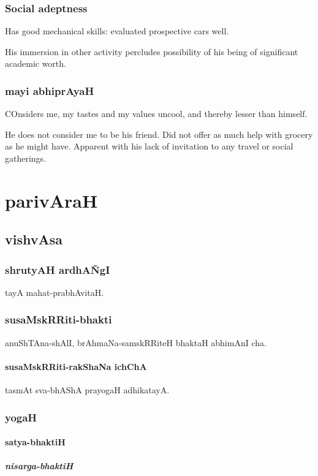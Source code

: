 \documentclass[oneside, article]{memoir}
\begin{document}
\section{Social adeptness}
Has good mechanical skills: evaluated prospective cars well.

His immersion in other activity percludes possibility of his being of significant academic worth.

\section{mayi abhiprAyaH}
COnsiders me, my tastes and my values uncool, and thereby lesser than himself.

He does not consider me to be his friend.
\subitem Did not offer as much help with grocery as he might have.
\subitem Apparent with his lack of invitation to any travel or social gatherings.

\part{parivAraH}
\chapter{vishvAsa}
\section{shrutyAH ardhA\~NgI}
tayA mahat-prabhAvitaH.

\section{susaMskRRiti-bhakti}
anuShTAna-shAlI, brAhmaNa-samskRRiteH bhaktaH abhimAnI cha.

\subsection{susaMskRRiti-rakShaNa ichChA}
tasmAt sva-bhAShA prayogaH adhikatayA.


\section{yogaH}
\subsection{satya-bhaktiH}


\subsubsection{nisarga-bhaktiH}
\end{document}
